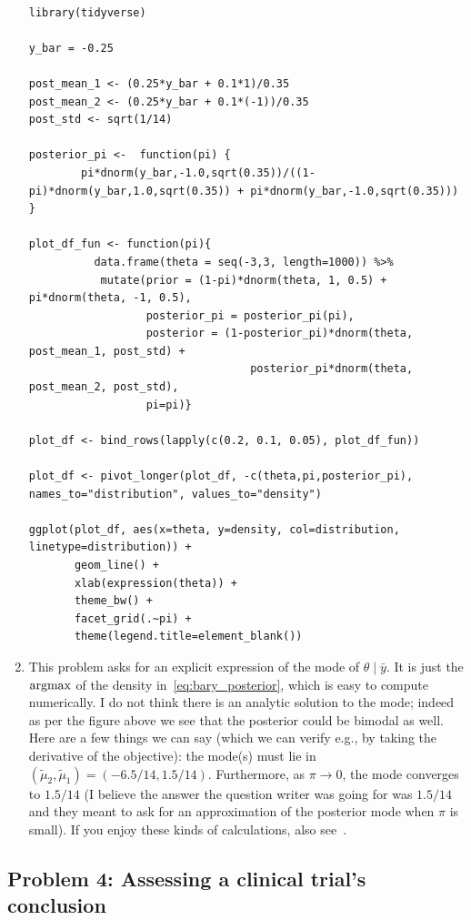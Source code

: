 \begin{enumerate}[label=(\alph*)]
\scriptsize
\begin{verbatim}

library(tidyverse)

y_bar = -0.25

post_mean_1 <- (0.25*y_bar + 0.1*1)/0.35
post_mean_2 <- (0.25*y_bar + 0.1*(-1))/0.35
post_std <- sqrt(1/14)

posterior_pi <-  function(pi) {
        pi*dnorm(y_bar,-1.0,sqrt(0.35))/((1-pi)*dnorm(y_bar,1.0,sqrt(0.35)) + pi*dnorm(y_bar,-1.0,sqrt(0.35))) }

plot_df_fun <- function(pi){
          data.frame(theta = seq(-3,3, length=1000)) %>%
           mutate(prior = (1-pi)*dnorm(theta, 1, 0.5) + pi*dnorm(theta, -1, 0.5),
                  posterior_pi = posterior_pi(pi),
                  posterior = (1-posterior_pi)*dnorm(theta, post_mean_1, post_std) +
                                  posterior_pi*dnorm(theta, post_mean_2, post_std),
                  pi=pi)}

plot_df <- bind_rows(lapply(c(0.2, 0.1, 0.05), plot_df_fun))

plot_df <- pivot_longer(plot_df, -c(theta,pi,posterior_pi), names_to="distribution", values_to="density")

ggplot(plot_df, aes(x=theta, y=density, col=distribution, linetype=distribution)) +
       geom_line() +
       xlab(expression(theta)) +
       theme_bw() +
       facet_grid(.~pi) +
       theme(legend.title=element_blank())
\end{verbatim}
\normalsize

\item This problem asks for an explicit expression of the mode of $\theta \mid \bar{y}$. It is just the $\operatorname*{argmax}$ of the density in~\eqref{eq:bary_posterior}, which is easy to compute numerically. I do not think there is an analytic solution to the mode; indeed as per the figure above we see that the posterior could be bimodal as well. Here are a few things we can say (which we can verify e.g., by taking the derivative of the objective): the mode(s) must lie in $(\tilde{\mu}_2, \tilde{\mu}_1) = (-6.5/14, 1.5/14)$. Furthermore, as $\pi \to 0$, the mode converges to $1.5/14$ (I believe the answer the question writer was going for was $1.5/14$ and they meant to ask for an approximation of the posterior mode when $\pi$ is small). If you enjoy these kinds of calculations, also see~\citet{behboodian1970modes}.


\end{enumerate}

\subsection*{Problem 4: Assessing a clinical trial's conclusion}

